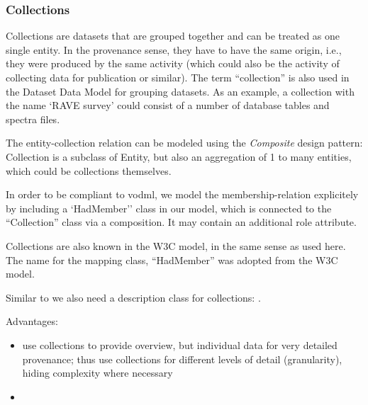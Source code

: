\subsubsection{Collections}
Collections are datasets that are grouped together and can be treated as one single entity. 
In the provenance sense, they have to have the same origin, i.e., they were 
produced by the same activity (which could also be the activity of collecting
data for publication or similar). The term ``collection'' is 
also used in the Dataset Data Model for grouping datasets. As an example, a collection 
with the name `RAVE survey' could consist of a number of database tables and spectra files.



The entity-collection relation can be modeled using the \emph{Composite} design pattern: 
Collection is a subclass of Entity, but also an aggregation of 1 to many entities, 
which could be collections themselves. 

In order to be compliant to vodml, we model the membership-relation explicitely 
by including a `HadMember'' class in our model, which is connected to the
``Collection'' class via a composition. It may contain an additional role attribute.

Collections are also known in the W3C model, in the same sense as used here. 
The name for the mapping class, ``HadMember'' was adopted from the W3C model.


Similar to  we also need a description class for collections: 
. 


Advantages:
\begin{itemize}
\item use collections to provide overview, but individual data for very detailed provenance; 
	  thus use collections for different levels of detail (granularity), hiding 
	  complexity where necessary
\item {}
\end{itemize}



